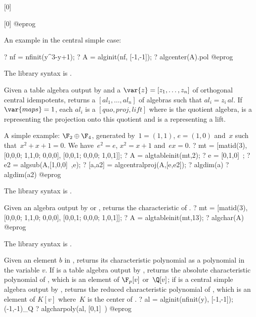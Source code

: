 [0]

[0]
@eprog

An example in the central simple case:

\bprog
? nf = nfinit(y^3-y+1);
? A = alginit(nf, [-1,-1]);
? algcenter(A).pol
@eprog

The library syntax is .

\label{se:algcentralproj}
Given a table algebra  output by  and a
 $\var{z}=[z_1,\dots,z_n]$ of orthogonal central idempotents,
returns a  $[al_1,\dots,al_n]$ of algebras such that
$al_i = z_i\, al$. If $\var{maps}=1$, each $al_i$ is a 
$[quo,proj,lift]$ where  is the quotient algebra,  is a
 representing the projection onto this quotient and  is a
 representing a lift.

A simple example: $\F_2\oplus \F_4$, generated by~$1=(1,1)$, $e=(1,0)$
and~$x$ such that~$x^2+x+1=0$. We have~$e^2=e$, $x^2=x+1$ and~$ex=0$.
\bprog
? mt = [matid(3), [0,0,0; 1,1,0; 0,0,0], [0,0,1; 0,0,0; 1,0,1]];
? A = algtableinit(mt,2);
? e = [0,1,0]~;
? e2 = algsub(A,[1,0,0]~,e);
? [a,a2] = algcentralproj(A,[e,e2]);
? algdim(a)
? algdim(a2)
@eprog

The library syntax is .

\label{se:algchar}
Given an algebra  output by  or ,
returns the characteristic of .
\bprog
? mt = [matid(3), [0,0,0; 1,1,0; 0,0,0], [0,0,1; 0,0,0; 1,0,1]];
? A = algtableinit(mt,13);
? algchar(A)
@eprog

The library syntax is .

\label{se:algcharpoly}
Given an element $b$ in , returns its characteristic polynomial
as a polynomial in the variable $v$. If  is a table algebra output
by , returns the absolute characteristic polynomial of
, which is an element of $\F_p[v]$ or~$\Q[v]$; if  is a
central simple algebra output by , returns the reduced
characteristic polynomial of , which is an element of $K[v]$ where~$K$
is the center of .
\bprog
? al = alginit(nfinit(y), [-1,-1]); \\ (-1,-1)_Q
? algcharpoly(al, [0,1]~)
@eprog


